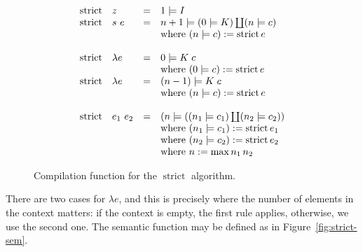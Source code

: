 \documentclass[conference]{IEEEtran}
\DeclareMathOperator{\strict}{strict}
\begin{document}
\begin{figure}
    \begin{equation*}
        \begin{array}{l l l l}
            \strict & z         & = & 1 \models I                                              \\
            \strict & s \ e     & = & n+1 \models (0 \models K) \coprod (n \models c)          \\
                    &           &   & \text{where } (n \models c) := \strict e                 \\
            \\
            \strict & \lambda e & = & 0 \models K \; c                                         \\
                    &           &   & \text{where } (0 \models c) := \strict e                 \\
            \strict & \lambda e & = & (n-1) \models K \; c                                     \\
                    &           &   & \text{where } (n \models c) := \strict e                 \\
            \\
            \strict & e_1 \ e_2 & = & (n \models ((n_1 \models c_1) \coprod (n_2 \models c_2)) \\
                    &           &   & \text{where } (n_1 \models c_1) := \strict e_1           \\
                    &           &   & \text{where } (n_2 \models c_2) := \strict e_2           \\
                    &           &   & \text{where } n := \max n_1 \, n_2                       \\
        \end{array}
    \end{equation*}
    \centering
    \caption{Compilation function for the $\strict$ algorithm.}
    \label{fig:strict}
\end{figure}

There are two cases for $\lambda e$, and this is precisely where the number of elements in the context matters:
if the context is empty, the first rule applies, otherwise, we use the second one.
The semantic function may be defined as in Figure~\ref{fig:strict-sem}.
\end{document}
